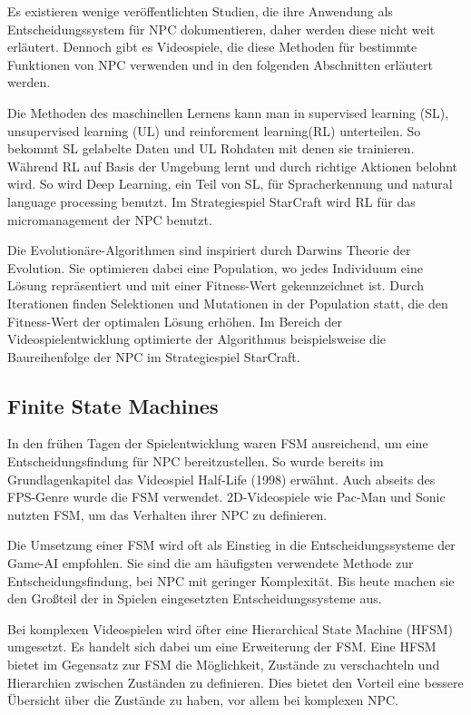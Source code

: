 Es existieren wenige ver\"{o}ffentlichten Studien, die ihre Anwendung als Entscheidungssystem f\"{u}r NPC dokumentieren, \autocite{U2023} daher werden diese nicht weit erl\"{a}utert. Dennoch gibt es Videospiele, die diese Methoden f\"{u}r bestimmte Funktionen von NPC verwenden und in den folgenden Abschnitten erl\"{a}utert werden.

Die Methoden des maschinellen Lernens kann man in supervised learning (SL), unsupervised learning (UL) und reinforcment learning(RL) unterteilen. So bekommt SL gelabelte Daten und UL Rohdaten mit denen sie trainieren. W\"{a}hrend RL auf Basis der Umgebung lernt und durch richtige Aktionen belohnt wird. So wird Deep Learning, ein Teil von SL, f\"{u}r Spracherkennung und natural language processing benutzt. Im Strategiespiel StarCraft wird RL f\"{u}r das micromanagement der NPC benutzt.

Die Evolution\"{a}re-Algorithmen sind inspiriert durch Darwins Theorie der Evolution. Sie optimieren dabei eine Population, wo jedes Individuum eine L\"{o}sung repr\"{a}sentiert und mit einer Fitness-Wert gekennzeichnet ist. Durch Iterationen finden Selektionen und Mutationen in der Population statt, die den Fitness-Wert der optimalen L\"{o}sung erh\"{o}hen. Im Bereich der Videospielentwicklung optimierte der Algorithmus beispielsweise die Baureihenfolge der NPC im Strategiespiel StarCraft. \autocite{review_game_ai}


\subsection{Finite State Machines}
\label{chap:fsm sota}

In den fr\"{u}hen Tagen der Spielentwicklung waren FSM ausreichend, um eine Entscheidungsfindung f\"{u}r NPC bereitzustellen. So wurde bereits im Grundlagenkapitel das Videospiel Half-Life (1998) erw\"{a}hnt. Auch abseits des FPS-Genre wurde die FSM verwendet. 2D-Videospiele wie Pac-Man und Sonic nutzten FSM, um das Verhalten ihrer NPC zu definieren. \autocite{U2023}

Die Umsetzung einer FSM wird oft als Einstieg in die Entscheidungssysteme der Game-AI empfohlen. Sie sind die am h\"{a}ufigsten verwendete Methode zur Entscheidungsfindung, bei NPC mit geringer Komplexit\"{a}t. Bis heute machen sie den Gro\ss{}teil der in Spielen eingesetzten Entscheidungssysteme aus.

Bei komplexen Videospielen wird \"{o}fter eine Hierarchical State Machine (HFSM) umgesetzt. Es handelt sich dabei um eine Erweiterung der FSM. Eine HFSM bietet im Gegensatz zur FSM die M\"{o}glichkeit, Zust\"{a}nde zu verschachteln und Hierarchien zwischen Zust\"{a}nden zu definieren. Dies bietet den Vorteil eine bessere \"{U}bersicht \"{u}ber die Zust\"{a}nde zu haben, vor allem bei komplexen NPC. \autocite{AIgames}


